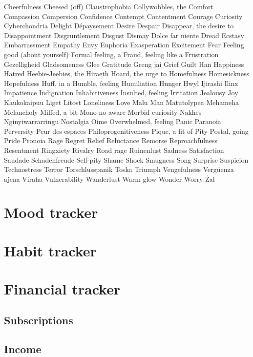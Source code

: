 \documentclass[a4paper]{article}
\begin{document}
	 Cheerfulness
	 Cheesed (off)
	 Claustrophobia
	 Collywobbles, the
	 Comfort
	 Compassion
	 Compersion
	 Confidence
	 Contempt
	 Contentment
	 Courage
	 Curiosity
	 Cyberchondria
	 Delight
	 Dépaysement
	 Desire
	 Despair
	 Disappear, the desire to
	 Disappointment
	 Disgruntlement
	 Disgust
	 Dismay
	 Dolce far niente
	 Dread
	 Ecstasy
	 Embarrassment
	 Empathy
	 Envy
	 Euphoria
	 Exasperation
	 Excitement
	 Fear
	 Feeling good (about yourself)
	 Formal feeling, a
	 Fraud, feeling like a
	 Frustration
	 Gezelligheid
	 Gladsomeness
	 Glee
	 Gratitude
	 Greng jai
	 Grief
	 Guilt
	 Han
	 Happiness
	 Hatred
	 Heebie-Jeebies, the
	 Hiraeth
	 Hoard, the urge to
	 Homefulness
	 Homesickness
	 Hopefulness
	 Huff, in a
	 Humble, feeling
	 Humiliation
	 Hunger
	 Hwyl
	 Ijirashi
	 Ilinx
	 Impatience
	 Indignation
	 Inhabitiveness
	 Insulted, feeling
	 Irritation
	 Jealousy
	 Joy
	 Kaukokaipuu
	 Liget
	 Litost
	 Loneliness
	 Love
	 Malu
	 Man
	 Matutolypea
	 Mehameha
	 Melancholy
	 Miffed, a bit
	 Mono no aware
	 Morbid curiosity
	 Nakhes
	 Nginyiwarrarringu
	 Nostalgia
	 Oime
	 Overwhelmed, feeling
	 Panic
	 Paranoia
	 Perversity
	 Peur des espaces
	 Philoprogenitiveness
	 Pique, a fit of
	 Pity
	 Postal, going
	 Pride
	 Pronoia
	 Rage
	 Regret
	 Relief
	 Reluctance
	 Remorse
	 Reproachfulness
	 Resentment
	 Ringxiety
	 Rivalry
	 Road rage
	 Ruinenlust
	 Sadness
	 Satisfaction
	 Saudade
	 Schadenfreude
   Self-pity
	 Shame
	 Shock
	 Smugness
	 Song
	 Surprise
	 Suspicion
	 Technostress
	 Terror
	 Torschlusspanik
	 Toska
	 Triumph
	 Vengefulness
	 Vergüenza ajena
	 Viraha
	 Vulnerability
	 Wanderlust
 	 Warm glow
	 Wonder
	 Worry
	 Żal
\newpage
\section{Mood tracker}
\newpage
\section{Habit tracker}
\newpage
\section{Financial tracker}
\subsection{Subscriptions}
\subsection{Income}
\end{document}
